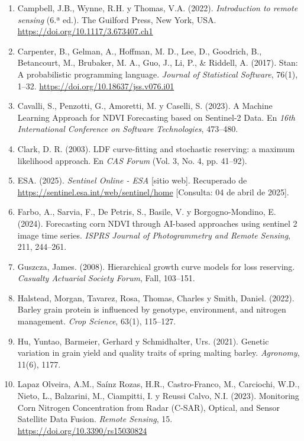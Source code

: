 \documentclass[
11pt, %
]{charter}
\begin{document}
\begin{enumerate}
    \item Campbell, J.B., Wynne, R.H. y Thomas, V.A. (2022). \emph{Introduction to remote sensing} (6.ª ed.). The Guilford Press, New York, USA. \url{https://doi.org/10.1117/3.673407.ch1}

    \item Carpenter, B., Gelman, A., Hoffman, M. D., Lee, D., Goodrich, B., Betancourt, M., Brubaker, M. A., Guo, J., Li, P., \& Riddell, A. (2017). Stan: A probabilistic programming language. \emph{Journal of Statistical Software}, 76(1), 1–32. \url{https://doi.org/10.18637/jss.v076.i01}

    \item Cavalli, S., Penzotti, G., Amoretti, M. y Caselli, S. (2023). A Machine Learning Approach for NDVI Forecasting based on Sentinel-2 Data. En \emph{16th International Conference on Software Technologies}, 473–480.

    \item Clark, D. R. (2003). LDF curve-fitting and stochastic reserving: a maximum likelihood approach. En \emph{CAS Forum} (Vol. 3, No. 4, pp. 41–92).

    \item ESA. (2025). \emph{Sentinel Online - ESA} [sitio web]. Recuperado de \url{https://sentinel.esa.int/web/sentinel/home} [Consulta: 04 de abril de 2025].

    \item Farbo, A., Sarvia, F., De Petris, S., Basile, V. y Borgogno-Mondino, E. (2024). Forecasting corn NDVI through AI-based approaches using sentinel 2 image time series. \emph{ISPRS Journal of Photogrammetry and Remote Sensing}, 211, 244–261.

    \item Guszcza, James. (2008). Hierarchical growth curve models for loss reserving. \emph{Casualty Actuarial Society Forum}, Fall, 103–151.

    \item Halstead, Morgan, Tavarez, Rosa, Thomas, Charles y Smith, Daniel. (2022). Barley grain protein is influenced by genotype, environment, and nitrogen management. \emph{Crop Science}, 63(1), 115–127.

    \item Hu, Yuntao, Barmeier, Gerhard y Schmidhalter, Urs. (2021). Genetic variation in grain yield and quality traits of spring malting barley. \emph{Agronomy}, 11(6), 1177.

    \item Lapaz Olveira, A.M., Saínz Rozas, H.R., Castro-Franco, M., Carciochi, W.D., Nieto, L., Balzarini, M., Ciampitti, I. y Reussi Calvo, N.I. (2023). Monitoring Corn Nitrogen Concentration from Radar (C-SAR), Optical, and Sensor Satellite Data Fusion. \emph{Remote Sensing}, 15. \url{https://doi.org/10.3390/rs15030824}


\end{enumerate}
\end{document}
